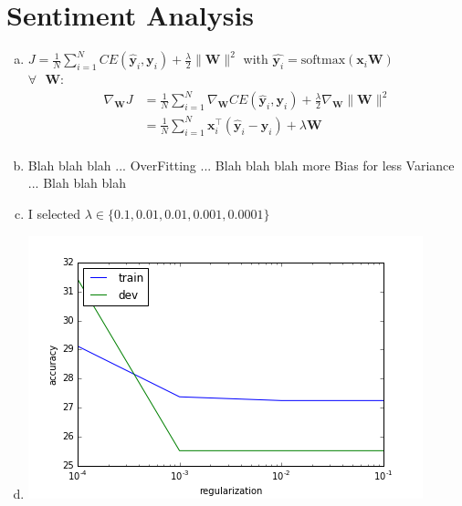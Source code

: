 \documentclass[19pt]{extarticle}
\begin{document}
\begin{enumerate}[a)]
\end{enumerate}


\section{ Sentiment Analysis}


\begin{enumerate}[a)]
\item $J = \frac{1}{N}\sum_{i=1}^NCE(\hat{\bm{y}}_i,\bm{y}_i) + \frac{\lambda}{2}\|\bm{W}\|^2$ with $\hat{\bm{y}_i} = \text{softmax}(\bm{x}_i\bm{W})$\\
$\forall\text{ } \bm{W}$: 
 \begin{equation*}\begin{split}
\nabla_{\bm{W}}J &= \frac{1}{N}\sum_{i=1}^N\nabla_{\bm{W}}CE(\hat{\bm{y}}_i,\bm{y}_i) + \frac{\lambda}{2}\nabla_{\bm{W}}\|\bm{W}\|^2\\
&= \frac{1}{N}\sum_{i=1}^N\bm{x}_i^\top(\hat{\bm{y}}_i-\bm{y}_i) + \lambda\bm{W}\\
\end{split}\end{equation*}


\item Blah blah blah ... OverFitting ... Blah blah blah more Bias for less Variance  ... Blah blah blah

\item I selected $\lambda \in \{ 0.1, 0.01, 0.01, 0.001, 0.0001\}$

\item \includegraphics{q4_reg_v_acc.png}
\end{enumerate}
\end{document}
